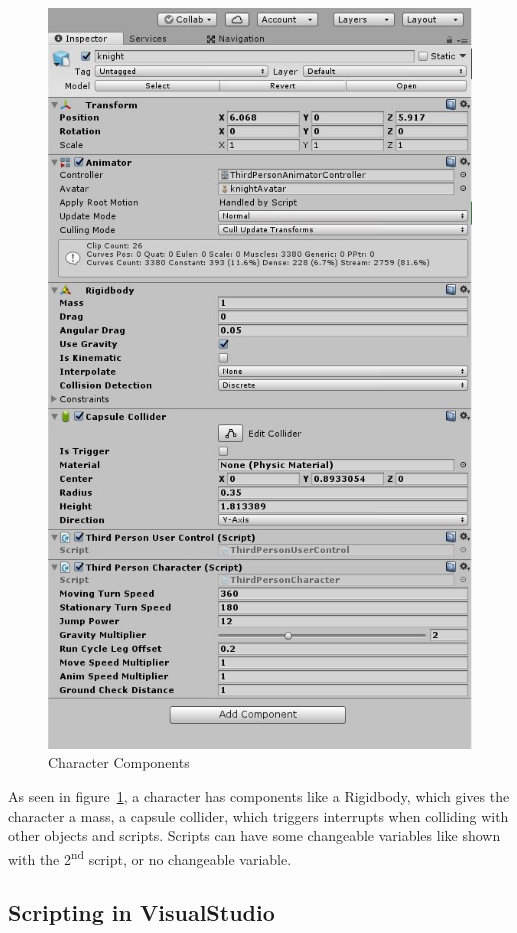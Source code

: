 \documentclass[conference]{IEEEtran}
\begin{document}
\begin{figure}[htbp]
  \includegraphics[width=.4\textwidth]{pictures/character_controls_character_components}
  \caption{Character Components}
  \label{fig:character_controls_character_components}
\end{figure}

As seen in figure~\ref{fig:character_controls_character_components}, a character has components like a Rigidbody, which gives the character a mass, a capsule collider, which triggers interrupts when colliding with other objects and scripts. Scripts can have some changeable variables like shown with the 2\textsuperscript{nd} script, or no changeable variable.

\lstset{
basicstyle=\ttfamily\small,
numbers=left,
breaklines=true,
numberstyle=\tiny,
numbersep=5pt,
tabsize=3
}

\lstset{language=[Sharp]C}

\subsection{Scripting in VisualStudio}
\end{document}

